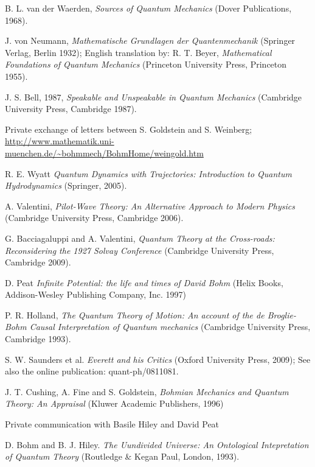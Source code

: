 \documentclass[onecolumn,nofootinbib, secnumarabic, amsmath, nobibnotes,11pt,aps,pra]{revtex4-1}
\begin{document}
\begin{thebibliography}{999}
B. L. van der Waerden, \emph{Sources of Quantum Mechanics} (Dover Publications, 1968).

J. von Neumann, \emph{Mathematische Grundlagen der Quantenmechanik} (Springer Verlag, Berlin 1932); English translation by: R. T. Beyer, \emph{Mathematical Foundations of Quantum Mechanics} (Princeton University Press, Princeton 1955).

J. S. Bell, 1987, \emph{Speakable and Unspeakable in Quantum Mechanics} (Cambridge University Press, Cambridge 1987).

Private exchange of letters between S. Goldstein and S. Weinberg; \url{http://www.mathematik.uni-muenchen.de/~bohmmech/BohmHome/weingold.htm}

R. E. Wyatt \emph{Quantum Dynamics with Trajectories: Introduction to Quantum Hydrodynamics} (Springer, 2005).

A. Valentini, \emph{Pilot-Wave Theory: An Alternative Approach to Modern Physics} (Cambridge University Press, Cambridge 2006).

G. Bacciagaluppi and A. Valentini, \emph{Quantum Theory at the Cross-roads: Reconsidering the 1927 Solvay Conference} (Cambridge University Press, Cambridge 2009).

D. Peat \emph{Infinite Potential: the life and times of David Bohm} (Helix Books, Addison-Wesley Publishing Company, Inc. 1997)

P. R. Holland, \emph{The Quantum Theory of Motion: An account of the de Broglie-Bohm Causal Interpretation of Quantum mechanics}  (Cambridge University Press, Cambridge 1993).

S. W. Saunders et al. \emph{Everett and his Critics} (Oxford University Press, 2009); See also the online publication: quant-ph/0811081.

J. T. Cushing, A. Fine and S. Goldstein, \emph{Bohmian Mechanics and Quantum Theory: An Appraisal}  (Kluwer Academic Publishers, 1996)

Private communication with Basile Hiley and David Peat

D. Bohm and B. J. Hiley. \emph{The Uundivided Universe: An Ontological Intepretation of Quantum Theory} (Routledge \& Kegan Paul, London, 1993).


\end{thebibliography}
\end{document}
